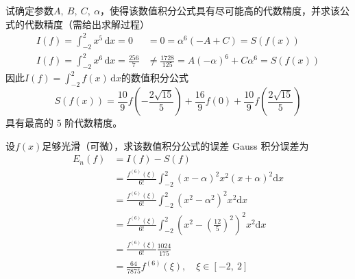 \documentclass[11pt]{article}
\begin{document}
\begin{question}
\begin{subquestion}{试确定参数$A,\ B,\ C,\ \alpha$，使得该数值积分公式具有尽可能高的代数精度，并求该公式的代数精度（需给出求解过程）}
{\begin{align*}
            I(f) = \int_{-2}^{2}\!{x^5\,\text{d}x} = 0             & =0= \alpha^6(-A + C) = S\left(f(x)\right)                             \\
            I(f) = \int_{-2}^{2}\!{x^6\,\text{d}x} = \frac{256}{7} & \neq \frac{1728}{125} = A(-\alpha)^6 + C\alpha^6 = S\left(f(x)\right)
        \end{align*}
        因此$I(f) = \displaystyle \int_{-2}^{2}\!{f(x)\,\text{d}x}$的数值积分公式
        \begin{equation*}
            S\left(f(x)\right) = \frac{10}{9}f\left(-\frac{2\sqrt{15}}{5}\right) + \frac{16}{9}f(0) + \frac{10}{9}f\left(\frac{2\sqrt{15}}{5}\right)
        \end{equation*}
        具有最高的 5 阶代数精度。
        }
    \end{subquestion}
    \begin{subquestion}{设$f(x)$足够光滑（可微），求该数值积分公式的误差}
        \answer
        {
            Gauss 积分误差为
            \begin{align*}
                E_n(f) & = I(f) - S(f)                                                                                         \\
                       & = \frac{f^{(6)}(\xi)}{6!} \int_{-2}^{2}\!(x - \alpha)^2x^2(x + \alpha)^2\text{d}x                     \\
                       & = \frac{f^{(6)}(\xi)}{6!} \int_{-2}^{2}\!(x^2 - \alpha^2)^2x^2\text{d}x                               \\
                       & = \frac{f^{(6)}(\xi)}{6!} \int_{-2}^{2}\!\left(x^2 - \left(\frac{12}{5}\right)^2\right)^2x^2\text{d}x \\
                       & = \frac{f^{(6)}(\xi)}{6!} \frac{1024}{175}                                                            \\
                       & = \frac{64}{7875} f^{(6)}(\xi), \quad \xi \in [-2,\ 2]
            \end{align*}
}
\end{subquestion}
\end{question}
\end{document}
